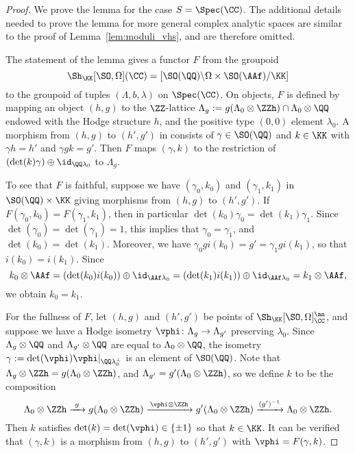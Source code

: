 \begin{proof}
We prove the lemma for the case $S = \Spec(\CC)$. The additional details needed to prove the lemma for more general complex analytic spaces are similar to the proof of Lemma~\ref{lem:moduli_vhs}, and are therefore omitted.

The statement of the lemma gives a functor $F$ from the groupoid
$$
\Sh_{\KK}[\SO,\Omega](\CC) = \left[ \SO(\QQ) \backslash \Omega \times \SO(\AAf) / \KK \right]
$$
    to the groupoid of tuples $(\Lambda,b,\lambda)$ on $\Spec(\CC)$. On objects, $F$ is defined by mapping an object $(h,g)$ to the $\ZZ$-lattice $\Lambda_g := g(\Lambda_0 \otimes \ZZh) \cap \Lambda_0 \otimes \QQ$ endowed with the Hodge structure $h$, and the positive type $(0,0)$ element $\lambda_0$. A morphism from $(h,g)$ to $(h',g')$ in consists of $\gamma \in \SO(\QQ)$ and $k \in \KK$ with $\gamma h = h'$ and $\gamma g k = g'$. Then $F$ maps $(\gamma,k)$ to the restriction of $(\det(k) \gamma) \oplus \id_{\QQ\lambda_0}$ to $\Lambda_g$.

To see that $F$ is faithful, suppose we have $(\gamma_0,k_0)$ and $(\gamma_1,k_1)$ in $\SO(\QQ) \times \KK$ giving morphisms from $(h,g)$ to $(h',g')$. If $F(\gamma_0,k_0) = F(\gamma_1,k_1)$, then in particular $\det(k_0) \gamma_0 = \det(k_1) \gamma_1$. Since $\det(\gamma_0) = \det(\gamma_1) = 1$, this implies that $\gamma_0 = \gamma_1$, and $\det(k_0) = \det(k_1)$. Moreover, we have $\gamma_0 g i(k_0) = g' = \gamma_1 g i(k_1)$, so that $i(k_0) = i(k_1)$. Since
    $$
    k_0 \otimes \AAf = (\det(k_0) i(k_0)) \oplus \id_{\AAf \lambda_0} = (\det(k_1) i(k_1)) \oplus \id_{\AAf \lambda_0} = k_1 \otimes \AAf,
    $$
we obtain $k_0 = k_1$.

For the fullness of $F$, let $(h,g)$ and $(h',g')$ be points of $\Sh_{\KK}[\SO,\Omega]_{\CC}^{\an}$, and suppose we have a Hodge isometry $\vphi\colon \Lambda_g \rightarrow \Lambda_{g'}$ preserving $\lambda_0$. Since $\Lambda_g \otimes \QQ$ and  $\Lambda_{g'} \otimes \QQ$ are equal to $\Lambda_0 \otimes \QQ$, the isometry $\gamma := \det(\vphi) \vphi|_{\QQ \lambda_0^{\perp}}$ is an element of $\SO(\QQ)$. Note that $\Lambda_g \otimes \ZZh = g(\Lambda_0 \otimes \ZZh)$, and $\Lambda_{g'} = g'(\Lambda_0 \otimes \ZZh)$, so we define $k$ to be the composition
$$
\Lambda_0 \otimes \ZZh \xrightarrow{\ g\ } g\!\left(\Lambda_0 \otimes \ZZh\right) \xrightarrow{\, \vphi \otimes \ZZh\, } g'\!\left(\Lambda_0 \otimes \ZZh\right) \xrightarrow{(g')^{-1}} \Lambda_0 \otimes \ZZh.
$$
Then $k$ satisfies $\det(k) = \det(\vphi) \in \{\pm 1\}$ so that $k \in \KK$. It can be verified that $(\gamma,k)$ is a morphism from $(h,g)$ to $(h',g')$ with $\vphi = F(\gamma,k)$.


\end{proof}
